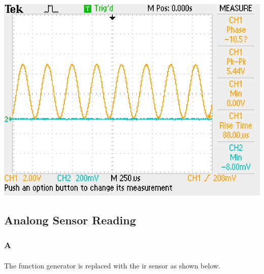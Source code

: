 \documentclass[12pt]{article}
\begin{document}
					\begin{center}
						\includegraphics[scale=0.5]{gone.jpg}\\
					\end{center}

		\subsection{Analong Sensor Reading}
			\subsubsection{A}
				\paragraph{}
					The function generator is replaced with the ir sensor as shown below.
\end{document}

